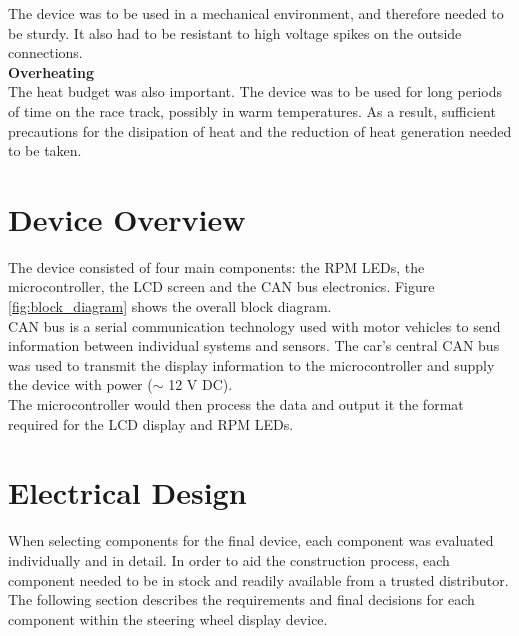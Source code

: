 \documentclass[a4paper,12pt]{article}
\begin{document}
The device was to be used in a mechanical environment, and therefore needed to be sturdy. It also had to be resistant to high voltage spikes on the outside connections. \\

\textbf{Overheating} \\

The heat budget was also important. The device was to be used for long periods of time on the race track, possibly in warm temperatures. As a result, sufficient precautions for the disipation of heat and the reduction of heat generation needed to be taken.


\newpage
\section{Device Overview}
\label{sec:device_overview}

The device consisted of four main components: the RPM LEDs, the microcontroller, the LCD screen and the CAN bus electronics. Figure \ref{fig:block_diagram} shows the overall block diagram. \\



CAN bus is a serial communication technology used with motor vehicles to send information between individual systems and sensors. The car's central CAN bus was used to transmit the display information to the microcontroller and supply the device with power ($\sim$ 12 V DC). \\

The microcontroller would then process the data and output it the format required for the LCD display and RPM LEDs. \\


\newpage
\section{Electrical Design}
\label{sec:electrical_design}

When selecting components for the final device, each component was evaluated individually and in detail. In order to aid the construction process, each component needed to be in stock and readily available from a trusted distributor. The following section describes the requirements and final decisions for each component within the steering wheel display device. \\
\end{document}
